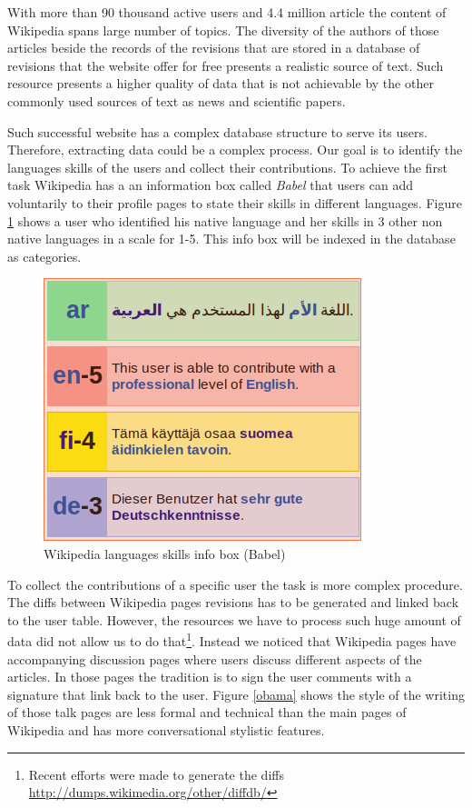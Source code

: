 \documentclass[11pt]{article}
\begin{document}
With more than 90 thousand active users and 4.4 million article the content of Wikipedia spans large number of topics. The diversity of the authors of those articles beside the records of the revisions that are stored in a database of revisions that the website offer for free presents a realistic source of text. Such resource presents a higher quality of data that is not achievable by the other commonly used sources of text as news and scientific papers.

Such successful website has a complex database structure to serve its users. Therefore, extracting data could be a complex process. Our goal is to identify the languages skills of the users and collect their contributions. To achieve the first task Wikipedia has a an information box called \emph{Babel} that users can add voluntarily to their profile pages to state their skills in different languages. Figure \ref{babel} shows a user who identified his native language and her skills in 3 other non native languages in a scale for 1-5. This info box will be indexed in the database as categories.


\begin{figure}[htp]
\centering
\includegraphics[scale=0.60]{babel}
\caption{Wikipedia languages skills info box (Babel)}
\label{babel}
\end{figure}

To collect the contributions of a specific user the task is more complex procedure. The diffs between Wikipedia pages revisions has to be generated and linked back to the user table. However, the resources we have to process such huge amount of data did not allow us to do that\footnote{Recent efforts were made to generate the diffs \url{http://dumps.wikimedia.org/other/diffdb/}}. Instead we noticed that Wikipedia pages have accompanying discussion pages where users discuss different aspects of the articles. In those pages the tradition is to sign the user comments with a signature that link back to the user. Figure \ref{obama} shows the style of the writing of those talk pages are less formal and technical than the main pages of Wikipedia and has more conversational stylistic features.
\end{document}
